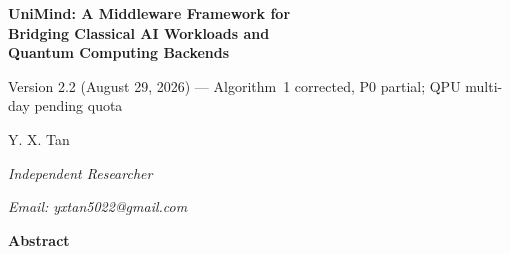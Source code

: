 ﻿\documentclass[12pt,a4paper]{article}
\begin{document}
\begin{titlepage}
\centering
\vspace*{2cm}

{\LARGE\bfseries UniMind: A Middleware Framework for\\[6pt]
Bridging Classical AI Workloads and\\[6pt]
Quantum Computing Backends\par}

\vspace{0.8cm}

{\normalsize\rmfamily Version 2.2 (August 29, 2026) --- Algorithm~1 corrected, P0 partial; QPU multi-day pending quota\par}

\vspace{1.2cm}

{\Large Y. X. Tan\par}
\vspace{0.3cm}
{\normalsize\itshape Independent Researcher\par}
{\normalsize\itshape Email: yxtan5022@gmail.com\par}

\vspace{1.8cm}

{\large\bfseries Abstract\par}
\vspace{0.5cm}


\end{titlepage}
\end{document}
